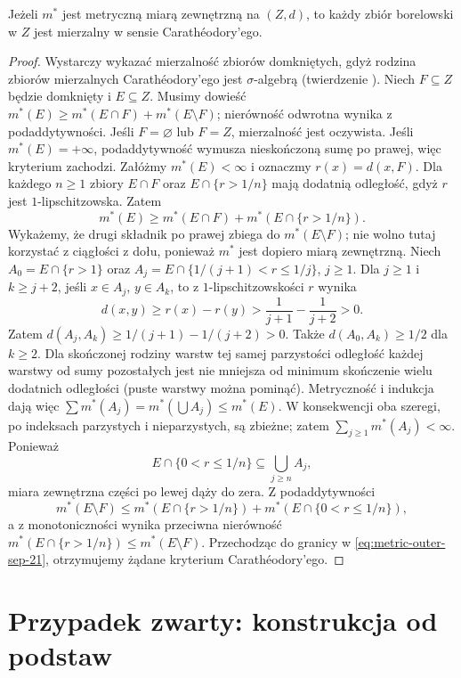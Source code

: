 \begin{lemat}
\label{lem:metric-outer-borel-21}
Jeżeli $m^*$ jest metryczną miarą zewnętrzną na $(Z,d)$,
to każdy zbiór borelowski w $Z$ jest mierzalny w sensie
Carathéodory'ego.
\end{lemat}
\begin{proof}
Wystarczy wykazać mierzalność zbiorów domkniętych, gdyż
rodzina zbiorów mierzalnych Carathéodory'ego jest
$\sigma$-algebrą (twierdzenie ).
Niech $F\subseteq Z$ będzie domknięty i $E\subseteq Z$.
Musimy dowieść
$m^*(E)\ge m^*(E\cap F)+m^*(E\setminus F)$;
nierówność odwrotna wynika z podaddytywności.
Jeśli $F=\varnothing$ lub $F=Z$, mierzalność jest oczywista.
Jeśli $m^*(E)=+\infty$, podaddytywność wymusza nieskończoną sumę po prawej, więc kryterium zachodzi. Załóżmy
$m^*(E)<\infty$ i oznaczmy $r(x)=d(x,F)$.
Dla każdego $n\ge1$ zbiory $E\cap F$ oraz
$E\cap\{r>1/n\}$ mają dodatnią odległość, gdyż
$r$ jest $1$-lipschitzowska. Zatem
\begin{equation}\label{eq:metric-outer-sep-21}
 m^*(E)\ge m^*(E\cap F)+m^*(E\cap\{r>1/n\}).
\end{equation}
Wykażemy, że drugi składnik po prawej zbiega do
$m^*(E\setminus F)$; nie wolno tutaj korzystać z ciągłości
z dołu, ponieważ $m^*$ jest dopiero miarą zewnętrzną.
Niech $A_0=E\cap\{r>1\}$ oraz
$A_j=E\cap\{1/(j+1)<r\le1/j\}$, $j\ge1$.
Dla $j\ge1$ i $k\ge j+2$, jeśli $x\in A_j$,
$y\in A_k$, to z $1$-lipschitzowskości $r$ wynika
\[
 d(x,y)\ge r(x)-r(y)>
 \frac1{j+1}-\frac1{j+2}>0.
\]
Zatem $d(A_j,A_k)\ge1/(j+1)-1/(j+2)>0$.
Także $d(A_0,A_k)\ge1/2$ dla $k\ge2$.
Dla skończonej rodziny warstw tej samej parzystości
odległość każdej warstwy od sumy pozostałych
jest nie mniejsza od minimum skończenie wielu
dodatnich odległości (puste warstwy można pominąć).
Metryczność i indukcja dają więc
$\sum m^*(A_j)=m^*(\bigcup A_j)\le m^*(E)$.
W konsekwencji oba szeregi, po indeksach parzystych
i nieparzystych, są zbieżne; zatem
$\sum_{j\ge1}m^*(A_j)<\infty$. Ponieważ
\[
 E\cap\{0<r\le1/n\}\subseteq\bigcup_{j\ge n}A_j,
\]
miara zewnętrzna części po lewej dąży do zera.
Z podaddytywności
\[
 m^*(E\setminus F)\le
 m^*(E\cap\{r>1/n\})+
 m^*(E\cap\{0<r\le1/n\}),
\]
a z monotoniczności wynika przeciwna nierówność
$m^*(E\cap\{r>1/n\})\le m^*(E\setminus F)$.
Przechodząc do granicy w \eqref{eq:metric-outer-sep-21},
otrzymujemy żądane kryterium Carathéodory'ego.
\end{proof}

\section{Przypadek zwarty: konstrukcja od podstaw}

